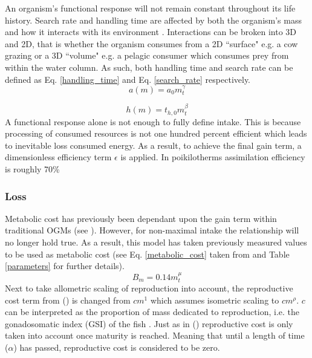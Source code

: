 \documentclass[a4paper, 11pt, hidelinks]{article} %
\begin{document}
	An organism's functional response will not remain constant throughout its life history.  Search rate and handling time are affected by both the organism's mass and how it interacts with its environment \parencite{Pawar2012}.  
	Interactions can be broken into 3D and 2D, that is whether the organism consumes from a 2D ``surface" e.g. a cow grazing or a 3D ``volume" e.g. a pelagic consumer which consumes prey from within the water column.  As such, both handling time and search rate can be defined as Eq. \ref{handling_time} and Eq. \ref{search_rate} respectively.
	\begin{equation}
		\label{search_rate}
		a(m) = a_0 m_t^\gamma
	\end{equation}
	
	\begin{equation}
		\label{handling_time}
		h(m) = t_{h,0} m_t^\beta
	\end{equation}
	A functional response alone is not enough to fully define intake.  This is because processing of consumed resources is not one hundred percent efficient which leads to inevitable loss consumed energy.  As a result, to achieve the final gain term, a dimensionless efficiency term $\epsilon$ is applied.  In poikilotherms assimilation efficiency is roughly 70\% \parencite{Peters1983}
	
	\subsubsection{Loss}
	Metabolic cost  has previously been dependant upon the gain term within traditional OGMs (see \cite{West2001, Hou2008}).  However, for non-maximal intake the relationship will no longer hold true.  As a result, this model has taken previously measured values to be used as metabolic cost (see Eq. \ref{metabolic_cost} taken from \cite{Peters1983} %
	and Table \ref{parameters} for further details).
	\begin{equation}
		\label{metabolic_cost}
		B_m = 0.14 m_t^\mu
	\end{equation}
	Next to take allometric scaling of reproduction into account, the reproductive cost term from \citeauthor{Charnov2001} (\citeyear{Charnov2001}) is changed from $cm^1$ which assumes isometric scaling to $cm^\rho$.  $c$ can be interpreted as the proportion of mass dedicated to reproduction, i.e. the gonadosomatic index (GSI) of the fish \parencite{Charnov2001}.  Just as in \citeauthor{Charnov2001} (\citeyear{Charnov2001}) reproductive cost is only taken into account once maturity is reached.  Meaning that until a length of time ($\alpha$) has passed, reproductive cost is considered to be zero.
	
\end{document}

